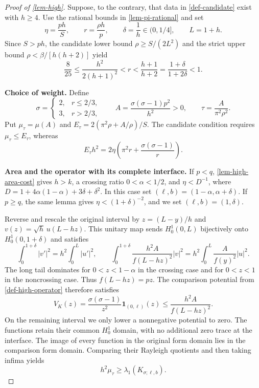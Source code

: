 \documentclass[11pt,a4paper]{article}
\theoremstyle{proofmanuscript}
\begin{document}
\begin{proof}[Proof of \ref{lem-high}]

Suppose, to the contrary, that data in \ref{def-candidate} exist with \(h\ge4\). Use the rational bounds in \ref{lem-pi-rational} and set \[
\eta=\frac{ph}{S},\qquad r=\frac{\rho h}{p},\qquad
\delta=\frac1h\in(0,1/4],\qquad L=1+h.
\] Since \(S>ph\), the candidate lower bound \(\rho\ge S/(2L^2)\) and the strict upper bound \(\rho<\beta/[h(h+2)]\) yield \[
\frac8{25}\le\frac{h^2}{2(h+1)^2}<r<\frac{h+1}{h+2}
=\frac{1+\delta}{1+2\delta}<1.
\tag{H.1.1}
\]

\textbf{Choice of weight.} Define \[
\sigma=\begin{cases}2,&r\le2/3,\\3,&r>2/3,\end{cases}
\qquad A=\frac{\sigma(\sigma-1)p^2}{h^2}>0,
\qquad\tau=\frac{A}{\pi^2\rho^2}.
\tag{H.1.2}
\] Put \(\mu_\tau=\mu(A)\) and \(E_\tau=2(\pi^2\rho+A/\rho)/S\). The candidate condition requires \(\mu_\tau\le E_\tau\), whereas \[
E_\tau h^2=2\eta\left(\pi^2r+\frac{\sigma(\sigma-1)}r\right).
\tag{H.1.3}
\]

\textbf{Area and the operator with its complete interface.} If \(p<q\), \ref{lem-high-area-cost} gives \(h>k\), a crossing ratio \(0<\alpha<1/2\), and \(\eta<D^{-1}\), where \(D=1+4\alpha(1-\alpha)+3\delta+\delta^2\). In this case set \((\ell,b)=(1-\alpha,\alpha+\delta)\). If \(p\ge q\), the same lemma gives \(\eta<(1+\delta)^{-2}\), and we set \((\ell,b)=(1,\delta)\).

Reverse and rescale the original interval by \(z=(L-y)/h\) and \(v(z)=\sqrt h\,u(L-hz)\). This unitary map sends \(H_0^1(0,L)\) bijectively onto \(H_0^1(0,1+\delta)\) and satisfies \[
\int_0^{1+\delta}|v'|^2=h^2\int_0^L|u'|^2,
\qquad
\int_0^{1+\delta}\frac{h^2A}{f(L-hz)^2}|v|^2
=h^2\int_0^L\frac{A}{f(y)^2}|u|^2.
\] The long tail dominates for \(0<z<1-\alpha\) in the crossing case and for \(0<z<1\) in the noncrossing case. Thus \(f(L-hz)=pz\). The comparison potential from \ref{def-high-operator} therefore satisfies \[
V_K(z)=\frac{\sigma(\sigma-1)}{z^2}\mathbf1_{(0,\ell)}(z)
\le\frac{h^2A}{f(L-hz)^2}.
\tag{H.3.1}
\] On the remaining interval we only lower a nonnegative potential to zero. The functions retain their common \(H_0^1\) domain, with no additional zero trace at the interface. The image of every function in the original form domain lies in the comparison form domain. Comparing their Rayleigh quotients and then taking infima yields \[
h^2\mu_\tau\ge\lambda_1(K_{\sigma;\ell,b}).
\tag{H.3.2}
\]


\end{proof}
\end{document}
